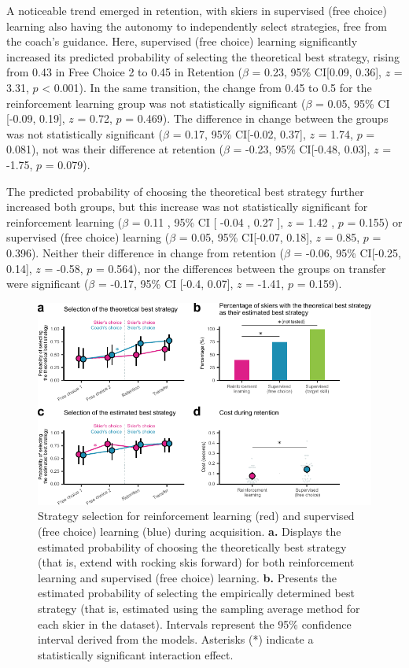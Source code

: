 \documentclass{article}
\begin{document}
A noticeable trend emerged in retention, with skiers in supervised (free choice) learning also having the autonomy to independently select strategies, free from the coach's guidance. Here, supervised (free choice) learning significantly increased its predicted probability of selecting the theoretical best strategy, rising from 0.43 in Free Choice 2 to 0.45 in Retention ($\beta$ = 0.23, 95\% CI[0.09, 0.36], $z$ = 3.31, $p$ < 0.001). In the same transition, the change from 0.45 to 0.5 for the reinforcement learning group was not statistically significant ($\beta$ = 0.05, 95\% CI [-0.09, 0.19], $z$ = 0.72, $p$ = 0.469). The difference in change between the groups was not statistically significant ($\beta$ = 0.17, 95\% CI[-0.02,  0.37], $z$ = 1.74, $p$ = 0.081), not was their difference at retention ($\beta$ = -0.23, 95\% CI[-0.48, 0.03], $z$ = -1.75, $p$ = 0.079).

The predicted probability of choosing the theoretical best strategy further increased both groups, but this increase was not statistically significant for reinforcement learning ($\beta$ = 0.11 , 95\% CI [ -0.04 ,  0.27 ], $z$ = 1.42 , $p$  =  0.155) or supervised (free choice) learning ($\beta$ = 0.05, 95\% CI[-0.07, 0.18], $z$ = 0.85, $p$ = 0.396). Neither their difference in change from retention ($\beta$ = -0.06, 95\% CI[-0.25, 0.14], $z$ = -0.58, $p$  =  0.564), nor the differences between the groups on transfer were significant ($\beta$ = -0.17, 95\% CI [-0.4, 0.07], $z$ = -1.41, $p$ = 0.159).


\begin{figure}[H]
\centering
\includegraphics{figures/figure_choice_estimated_4.pdf}
\caption{Strategy selection for reinforcement learning (red) and supervised (free choice) learning (blue) during acquisition. \textbf{a.} Displays the estimated probability of choosing the theoretically best strategy (that is, extend with rocking skis forward) for both reinforcement learning and supervised (free choice) learning. \textbf{b.} Presents the estimated probability of selecting the empirically determined best strategy (that is, estimated using the sampling average method for each skier in the dataset). Intervals represent the 95\% confidence interval derived from the models. Asterisks (*) indicate a statistically significant interaction effect.}\label{fig: choice_estimated}
\end{figure}
\end{document}
